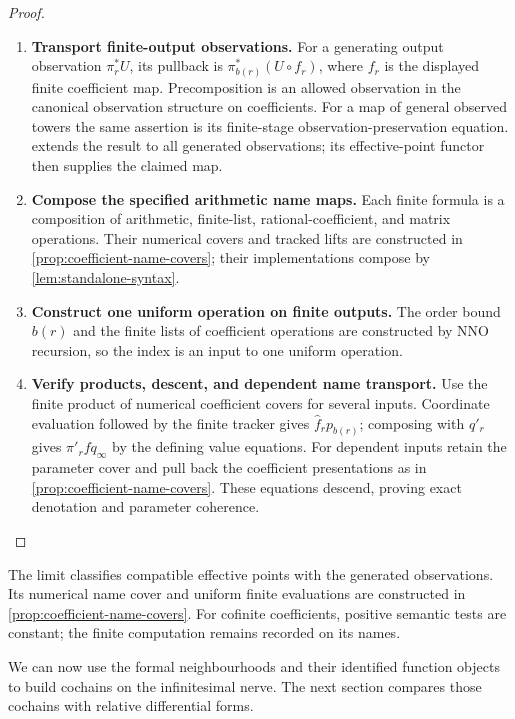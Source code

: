 \documentclass[11pt,a4paper]{article}
\numberwithin{algorithm}{section}
\numberwithin{equation}{section}
\theoremstyle{definition}
\theoremstyle{remark}
\theoremstyle{plain}
\theoremstyle{definition}
\theoremstyle{plain}
\begin{document}
\begin{proof}\leavevmode
\begin{enumerate}[leftmargin=*,align=left]
\item \textbf{Transport finite-output observations.}
For a generating output observation $\pi_r^*U$, its pullback is
$\pi_{b(r)}^*(U\circ f_r)$, where $f_r$ is the displayed finite
coefficient map.  Precomposition is an allowed observation in the
canonical observation structure on coefficients.  For a map of general
observed towers the same assertion is its finite-stage
observation-preservation equation.  
extends the result to all generated observations; its effective-point
functor then supplies the claimed map.

\item \textbf{Compose the specified arithmetic name maps.}
Each finite formula is a composition of arithmetic, finite-list,
rational-coefficient, and matrix operations. Their numerical covers
and tracked lifts are constructed in
\cref{prop:coefficient-name-covers}; their implementations compose
by \cref{lem:standalone-syntax}.

\item \textbf{Construct one uniform operation on finite outputs.}
The order bound $b(r)$ and the finite lists of coefficient operations
are constructed by NNO recursion, so the index is an input to one
uniform operation.

\item \textbf{Verify products, descent, and dependent name transport.}
Use the finite product of numerical coefficient covers for several
inputs. Coordinate evaluation followed by the finite tracker gives
$\widehat f_rp_{b(r)}$; composing with $q'_r$ gives
$\pi'_rfq_\infty$ by the defining value equations. For dependent
inputs retain the parameter cover and pull back the coefficient
presentations as in \cref{prop:coefficient-name-covers}. These
equations descend, proving exact denotation and parameter coherence.
\end{enumerate}
\end{proof}

The limit classifies compatible effective points with the generated
observations. Its numerical name cover and uniform finite
evaluations are constructed in \cref{prop:coefficient-name-covers}.
For cofinite coefficients, positive semantic tests are constant;
the finite computation remains recorded on its names.

We can now use the formal neighbourhoods and their identified
function objects to build cochains on the infinitesimal nerve.
The next section compares those cochains with relative differential
forms.
\end{document}
